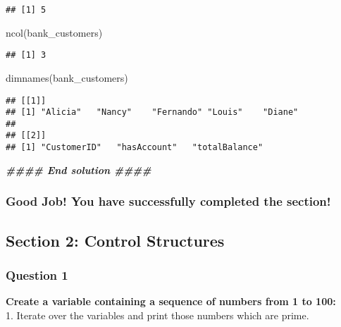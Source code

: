 \documentclass[
]{article}
\newenvironment{Shaded}{\begin{snugshade}}{\end{snugshade}}
\newcommand{\DocumentationTok}[1]{\textcolor[rgb]{0.56,0.35,0.01}{\textbf{\textit{#1}}}}
\newcommand{\FunctionTok}[1]{\textcolor[rgb]{0.00,0.00,0.00}{#1}}
\newcommand{\NormalTok}[1]{#1}
\begin{document}
\begin{verbatim}
## [1] 5
\end{verbatim}

\begin{Shaded}
\begin{Highlighting}[]
\FunctionTok{ncol}\NormalTok{(bank\_customers)}
\end{Highlighting}
\end{Shaded}

\begin{verbatim}
## [1] 3
\end{verbatim}

\begin{Shaded}
\begin{Highlighting}[]
\FunctionTok{dimnames}\NormalTok{(bank\_customers)}
\end{Highlighting}
\end{Shaded}

\begin{verbatim}
## [[1]]
## [1] "Alicia"   "Nancy"    "Fernando" "Louis"    "Diane"   
## 
## [[2]]
## [1] "CustomerID"   "hasAccount"   "totalBalance"
\end{verbatim}

\begin{Shaded}
\begin{Highlighting}[]
\DocumentationTok{\#\#\#\# End solution \#\#\#\#}
\end{Highlighting}
\end{Shaded}

\hypertarget{good-job-you-have-successfully-completed-the-section}{%
\subsubsection{Good Job! You have successfully completed the
section!}\label{good-job-you-have-successfully-completed-the-section}}

\hypertarget{section-2-control-structures}{%
\subsection{Section 2: Control
Structures}\label{section-2-control-structures}}

\hypertarget{question-1-1}{%
\subsubsection{Question 1}\label{question-1-1}}

\textbf{Create a variable containing a sequence of numbers from 1 to
100:}\\
1. Iterate over the variables and print those numbers which are prime.
\end{document}
